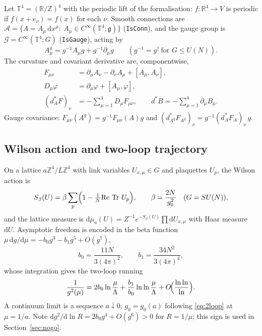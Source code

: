 \documentclass[11pt,a4paper]{article}
\theoremstyle{definition}
\theoremstyle{remark}
\newcommand{\R}{\mathbb{R}}
\newcommand{\Z}{\mathbb{Z}}
\newcommand{\T}{\mathbb{T}}
\newcommand{\g}{\mathfrak{g}}
\newcommand{\Tr}{\operatorname{Tr}}
\newcommand{\dd}{\mathrm{d}}
\newcommand{\CalA}{\mathcal{A}}
\newcommand{\CalG}{\mathcal{G}}
\begin{document}
Let $\T^4=(\R/\Z)^4$ with the periodic lift of the formalisation: $f:\R^4\to V$ is periodic if $f(x+e_\nu)=f(x)$ for each $\nu$. Smooth connections are $\CalA=\{A=A_\mu\,\dd x^\mu:\ A_\mu\in C^\infty(\T^4;\g)\}$ (\texttt{IsConn}), and the gauge group is $\CalG=C^\infty(\T^4;G)$ (\texttt{IsGauge}), acting by
\begin{equation}
A^g_\mu=g^{-1}A_\mu g+g^{-1}\partial_\mu g\qquad(g^{-1}=g^{\dagger}\ \text{for }G\le U(N)).
\end{equation}
The curvature and covariant derivative are, componentwise,
\begin{align}
F_{\mu\nu}&=\partial_\mu A_\nu-\partial_\nu A_\mu+[A_\mu,A_\nu],\\
D_\mu\varphi&=\partial_\mu\varphi+[A_\mu,\varphi],\\
(d_A^*F)_\nu&=-\sum_{\mu=1}^4 D_\mu F_{\mu\nu},\qquad d^*B=-\sum_{\mu=1}^4\partial_\mu B_\mu .
\end{align}
Gauge covariance: $F_{\mu\nu}(A^g)=g^{-1}F_{\mu\nu}(A)g$ and $(d_{A^g}^*F_{A^g})_\nu=g^{-1}(d_A^*F_A)_\nu\, g$.

\subsection{Wilson action and two-loop trajectory}

On a lattice $a\Z^4/L\Z^4$ with link variables $U_{x,\mu}\in G$ and plaquettes $U_p$, the Wilson action is
\begin{equation}
S_\beta(U)=\beta\sum_{p}\Bigl(1-\tfrac1N\mathrm{Re}\,\Tr\,U_p\Bigr),\qquad \beta=\frac{2N}{g_0^2}\quad(G=SU(N)),
\end{equation}
and the lattice measure is $\dd\mu_{a}(U)=Z^{-1}e^{-S_\beta(U)}\prod\dd U_{x,\mu}$ with Haar measure $\dd U$. Asymptotic freedom is encoded in the beta function $\mu\,\dd g/\dd\mu=-b_0g^3-b_1g^5+O(g^7)$,
\begin{equation}
b_0=\frac{11N}{3(4\pi)^2},\qquad b_1=\frac{34N^2}{3(4\pi)^4},
\end{equation}
whose integration gives the two-loop running
\begin{equation}\label{eq:2loop}
\frac1{g^2(\mu)}=2b_0\ln\frac{\mu}{\Lambda}+\frac{b_1}{b_0}\ln\ln\frac{\mu}{\Lambda}+O\!\Bigl(\frac{\ln\ln}{\ln}\Bigr).
\end{equation}
A continuum limit is a sequence $a\downarrow0$, $g_0=g_0(a)$ following \eqref{eq:2loop} at $\mu=1/a$. Note $\dd g^2/\dd\ln R=2b_0g^4+O(g^6)>0$ for $R=1/\mu$; this sign is used in Section~\ref{sec:nogo}.
\end{document}
